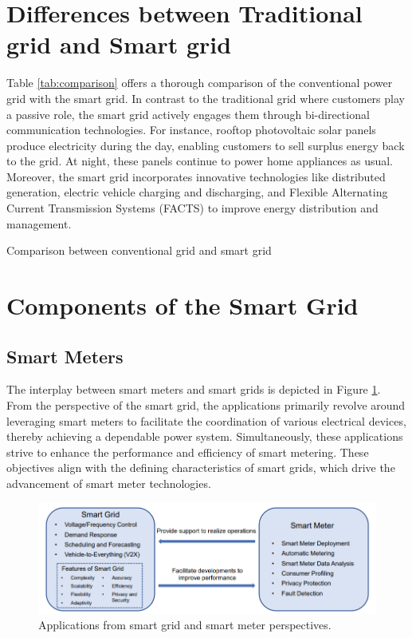 \section{Differences between Traditional grid and Smart grid }
Table \ref{tab:comparison} offers a thorough comparison of the conventional power grid with the smart grid. In contrast to the traditional grid where customers play a passive role, the smart grid actively engages them through bi-directional communication technologies. For instance, rooftop photovoltaic solar panels produce electricity during the day, enabling customers to sell surplus energy back to the grid. At night, these panels continue to power home appliances as usual. Moreover, the smart grid incorporates innovative technologies like distributed generation, electric vehicle charging and discharging, and Flexible Alternating Current Transmission Systems (FACTS) to improve energy distribution and management.\cite{zhang2014smart}
\begin{table}[h]
  
	\caption{Comparison between conventional grid and smart grid \cite{miller2008understanding}}
    
	\label{tab:comparison}
\end{table}


\section{Components of the Smart Grid }  

\subsection{Smart Meters}
The interplay between smart meters and smart grids is depicted in Figure \ref{fig:SmartMeter}. From the perspective of the smart grid, the applications primarily revolve around leveraging smart meters to facilitate the coordination of various electrical devices, thereby achieving a dependable power system. Simultaneously, these applications strive to enhance the performance and efficiency of smart metering. These objectives align with the defining characteristics of smart grids, which drive the advancement of smart meter technologies.\cite{chen2023control}
\begin{figure}[h]
	\centering
	\includegraphics[width=\textwidth]{figures/SmartMeter.PNG}
	\caption{Applications from smart grid and smart meter perspectives. \cite{chen2023control}}
	\label{fig:SmartMeter}
\end{figure}
